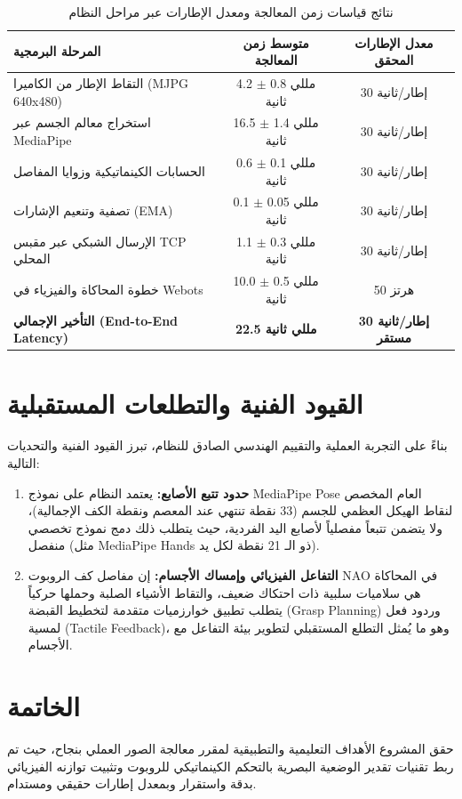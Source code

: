 \documentclass[11pt,a4paper]{article}
\begin{document}
\begin{table}[htbp]
\centering
\caption{نتائج قياسات زمن المعالجة ومعدل الإطارات عبر مراحل النظام}
\label{tab:performance}
\begin{tabular}{lcc}
\toprule
\textbf{المرحلة البرمجية} & \textbf{متوسط زمن المعالجة} & \textbf{معدل الإطارات المحقق} \\
\midrule
التقاط الإطار من الكاميرا (MJPG 640x480) & 4.2 $\pm$ 0.8 مللي ثانية & 30 إطار/ثانية \\
استخراج معالم الجسم عبر MediaPipe & 16.5 $\pm$ 1.4 مللي ثانية & 30 إطار/ثانية \\
الحسابات الكينماتيكية وزوايا المفاصل & 0.6 $\pm$ 0.1 مللي ثانية & 30 إطار/ثانية \\
تصفية وتنعيم الإشارات (EMA) & 0.1 $\pm$ 0.05 مللي ثانية & 30 إطار/ثانية \\
الإرسال الشبكي عبر مقبس TCP المحلي & 1.1 $\pm$ 0.3 مللي ثانية & 30 إطار/ثانية \\
خطوة المحاكاة والفيزياء في Webots & 10.0 $\pm$ 0.5 مللي ثانية & 50 هرتز \\
\midrule
\textbf{التأخير الإجمالي (End-to-End Latency)} & \textbf{22.5 مللي ثانية} & \textbf{30 إطار/ثانية مستقر} \\
\bottomrule
\end{tabular}
\end{table}

\section{القيود الفنية والتطلعات المستقبلية}
بناءً على التجربة العملية والتقييم الهندسي الصادق للنظام، تبرز القيود الفنية والتحديات التالية:
\begin{enumerate}
    \item \textbf{حدود تتبع الأصابع:} يعتمد النظام على نموذج MediaPipe Pose العام المخصص لنقاط الهيكل العظمي للجسم (33 نقطة تنتهي عند المعصم ونقطة الكف الإجمالية)، ولا يتضمن تتبعاً مفصلياً لأصابع اليد الفردية، حيث يتطلب ذلك دمج نموذج تخصصي منفصل (مثل MediaPipe Hands ذو الـ 21 نقطة لكل يد).
    \item \textbf{التفاعل الفيزيائي وإمساك الأجسام:} إن مفاصل كف الروبوت NAO في المحاكاة هي سلاميات سلبية ذات احتكاك ضعيف، والتقاط الأشياء الصلبة وحملها حركياً يتطلب تطبيق خوارزميات متقدمة لتخطيط القبضة (Grasp Planning) وردود فعل لمسية (Tactile Feedback)، وهو ما يُمثل التطلع المستقبلي لتطوير بيئة التفاعل مع الأجسام.
\end{enumerate}

\section{الخاتمة}
حقق المشروع الأهداف التعليمية والتطبيقية لمقرر معالجة الصور العملي بنجاح، حيث تم ربط تقنيات تقدير الوضعية البصرية بالتحكم الكينماتيكي للروبوت وتثبيت توازنه الفيزيائي بدقة واستقرار وبمعدل إطارات حقيقي ومستدام.
\end{document}
